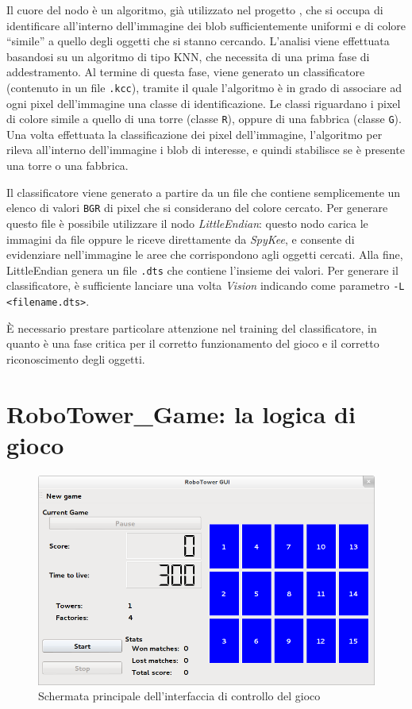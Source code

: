 Il cuore del nodo è un algoritmo, già utilizzato nel progetto \cite{docmandelli}, che si occupa di identificare all'interno dell'immagine dei blob sufficientemente uniformi e di colore ``simile'' a quello degli oggetti che si stanno cercando. L'analisi viene effettuata basandosi su un algoritmo di tipo KNN, che necessita di una prima fase di addestramento. Al termine di questa fase, viene generato un classificatore (contenuto in un file \verb|.kcc|), tramite il quale l'algoritmo è in grado di associare ad ogni pixel dell'immagine una classe di identificazione. Le classi riguardano i pixel di colore simile a quello di una torre (classe \verb|R|), oppure di una fabbrica (classe \verb|G|). Una volta effettuata la classificazione dei pixel dell'immagine, l'algoritmo per rileva all'interno dell'immagine i blob di interesse, e quindi stabilisce se è presente una torre o una fabbrica.

Il classificatore viene generato a partire da un file che contiene semplicemente un elenco di valori \verb|BGR| di pixel che si considerano del colore cercato. Per generare questo file è possibile utilizzare il nodo \emph{LittleEndian}: questo nodo carica le immagini da file oppure le riceve direttamente da \emph{SpyKee}, e consente di evidenziare nell'immagine le aree che corrispondono agli oggetti cercati. Alla fine, LittleEndian genera un file \verb|.dts| che contiene l'insieme dei valori. Per generare il classificatore, è sufficiente lanciare una volta \emph{Vision} indicando come parametro \verb|-L <filename.dts>|.


\begin{nota}
È necessario prestare particolare attenzione nel training del classificatore, in quanto è una fase critica per il corretto funzionamento del gioco e il corretto riconoscimento degli oggetti.
\end{nota}

\section{RoboTower\_Game: la logica di gioco}
\begin{figure}
\centering
\includegraphics[scale=0.43]{images/rtgame}
\caption{Schermata principale dell'interfaccia di controllo del gioco}
\end{figure}

